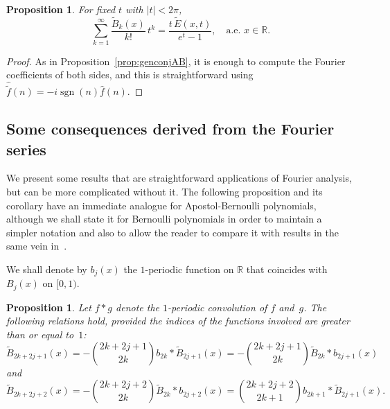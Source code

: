 \documentclass[11pt,a4paper,reqno]{amsart}
\newcommand{\R}{\mathbb{R}}
\let\hat\widehat
\let\tilde\widetilde
\newcommand{\sgn}{\operatorname{sgn}}
\theoremstyle{plain}
\newtheorem{prop}[theorem]{Proposition}
\theoremstyle{remark}
\numberwithin{equation}{section}
\begin{document}
\begin{prop}
\label{prop:genconjB}
For fixed $t$ with $|t|<2 \pi$,
\begin{equation*}
  \sum_{k=1}^\infty \frac{\tilde{B}_k(x)}{k!} \, t^k
  = \frac{t\,\tilde{E}(x,t)}{e^t-1},\quad \text{a.e. } x\in\R.
\end{equation*}
\end{prop}

\begin{proof}
As in Proposition~\ref{prop:genconjAB}, it is enough to compute the Fourier coefficients of both sides, and this is straightforward using $\widehat{\tilde{f}}(n) = -i\sgn(n)\hat{f}(n)$.
\end{proof}

\subsection{Some consequences derived from the Fourier series}
\label{subsec:ConseqFS}

We present some results that are straightforward applications of Fourier analysis, but can be more complicated without it. The following proposition and its corollary have an immediate analogue for Apostol-Bernoulli polynomials, although we shall state it for Bernoulli polynomials in order to maintain a simpler notation and also to allow the reader to compare it with results in the same vein in~\cite{Ha}.

We shall denote by $b_j(x)$ the $1$-periodic function on $\R$ that coincides with $B_{j}(x)$ on $[0,1)$.

\begin{prop}
Let $f*g$ denote the $1$-periodic convolution of $f$ and~$g$.
The following relations hold, provided the indices of the functions involved are greater than or equal to~$1$:
\begin{equation*}
  \tilde{B}_{2k+2j+1}(x) = -\binom{2k+2j+1}{2k} b_{2k} * \tilde{B}_{2j+1}(x)
  = -\binom{2k+2j+1}{2k} \tilde{B}_{2k} * b_{2j+1} (x)
\end{equation*}
and
\begin{equation*}
  \tilde{B}_{2k+2j+2}(x) = -\binom{2k+2j+2}{2k} \tilde{B}_{2k} * b_{2j+2}(x)
  = \binom{2k+2j+2}{2k+1} b_{2k+1} * \tilde{B}_{2j+1} (x).
\end{equation*}
\end{prop}
\end{document}
